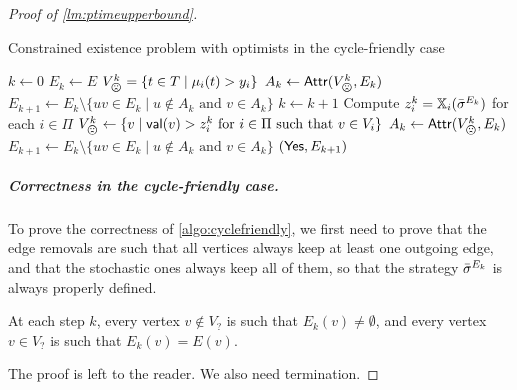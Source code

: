 \begin{proof}[Proof of \cref{lm:ptimeupperbound}]
            \begin{algorithm}
            \begin{algorithmic}\caption{Constrained existence problem with optimists in the cycle-friendly case}\label{algo:cyclefriendly}
                    \State $k \gets 0$
                    \State $E_k\gets E$
                    \State $V_\bad^k = \{t\in T \mid \mu_i(t)> y_i\}$ 
                    \State $A_k \gets \Attr(V^k_\bad, E_k)$
                        \Return{$\No$}
                    \Else
                        \State $E_{k+1} \gets E_k \setminus \{uv\in E_k\mid u\not\in A_k\text{ and }v\in A_k\}$
                        \State $k\gets k+1$
                        \State Compute $z^k_i = \mathbb{X}_i({\bar{\sigma}}^{E_k})$ for each $i \in \Pi$
                        \State $V^k_\bad \gets \{v \mid \val(v) > z_i^k \text{ for } i \in \Pi \text{ such that } v \in V_i\}$
                        \State $A_k \gets \Attr(V^k_\bad, E_k)$
                            \Return{$\No$}
                        \Else
                            \State $E_{k+1} \gets E_k \setminus \{uv\in E_k\mid u\notin A_k\text{ and }v\in A_k\}$
                        \EndIf
                    \EndWhile
                    \EndIf
                        \Return $(\mathsf{Yes}, E_{k+1})$
                    \Else{\text{ }}\Return{$\No$}
                    \EndIf
                \EndProcedure
            \end{algorithmic}
        \end{algorithm}

     \subparagraph*{Correctness in the cycle-friendly case.}
To prove the correctness of \cref{algo:cyclefriendly}, we first need to prove that the edge removals are such that all vertices always keep at least one outgoing edge, and that the stochastic ones always keep all of them, so that the strategy ${\bar{\sigma}}^{E_k}$ is always properly defined.

\begin{invariant}
    At each step $k$, every vertex $v \not\in V_?$ is such that $E_k(v) \neq \emptyset$, and every vertex $v \in V_?$ is such that $E_k(v) = E(v)$.
\end{invariant}

The proof is left to the reader.
We also need termination.


\end{proof}
